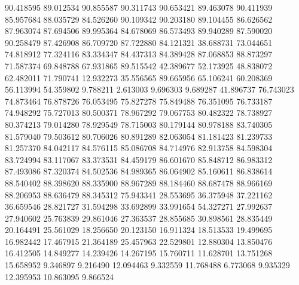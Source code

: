 90.418595
89.012534
90.855587
90.311743
90.653421
89.463078
90.411939
85.957684
88.035729
84.526260
90.109342
90.203180
89.104455
86.626562
87.963074
87.694506
89.995364
84.678069
86.573493
89.940289
87.590020
90.258479
87.426908
86.709720
87.722880
84.121321
38.688731
73.044651
74.818912
77.324116
83.334347
84.437313
84.389428
87.068853
88.873297
71.587374
69.848788
67.931865
89.515542
42.389677
52.173925
48.838072
62.482011
71.790741
12.932273
35.556565
89.665956
65.106241
60.208369
56.113994
54.359802
9.788211
2.613003
9.696303
9.689287
41.896737
76.743023
74.873464
76.878726
76.053495
75.827278
75.849488
76.351095
76.733187
74.948292
75.727013
80.500371
78.967292
79.067753
80.482322
78.738927
80.374213
79.014280
78.929549
78.715003
80.179144
80.978188
83.740305
81.579040
79.503612
80.706026
80.891289
82.063054
81.181423
81.239733
81.257370
84.042117
84.576115
85.086708
84.714976
82.913758
84.598304
83.724994
83.117067
83.373531
84.459179
86.601670
85.848712
86.983312
87.493086
87.320374
84.502536
84.989365
86.064902
85.160611
86.838614
88.540402
88.398620
88.335900
88.967289
88.184460
88.687478
88.966169
88.206953
88.636479
88.345312
75.943341
28.553695
36.375948
37.221162
36.659546
28.821727
31.594298
33.692899
33.991654
54.327271
27.992637
27.940602
25.763839
29.861046
27.363537
28.855685
30.898561
28.835449
20.164491
25.561029
18.256650
20.123150
16.911324
18.513533
19.499695
16.982442
17.467915
21.364189
25.457963
22.529801
12.880304
13.850476
16.412505
14.849277
14.239426
14.267195
15.760711
11.628701
13.751268
15.658952
9.346897
9.216490
12.094463
9.332559
11.768488
6.773068
9.935329
12.395953
10.863095
9.866524
